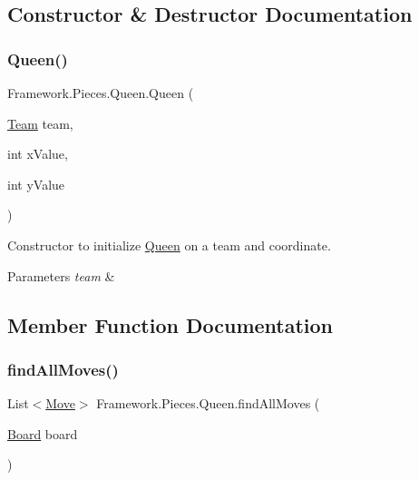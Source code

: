 \subsection{Constructor \& Destructor Documentation}
\hypertarget{class_framework_1_1_pieces_1_1_queen_a017f9ef7c69a9e0b7aadbd301889e465}{}\label{class_framework_1_1_pieces_1_1_queen_a017f9ef7c69a9e0b7aadbd301889e465} 
\subsubsection{\texorpdfstring{Queen()}{Queen()}}
{\footnotesize\ttfamily Framework.\+Pieces.\+Queen.\+Queen (\begin{DoxyParamCaption}\item[{\hyperlink{class_framework_1_1_team}{Team}}]{team,  }\item[{int}]{x\+Value,  }\item[{int}]{y\+Value }\end{DoxyParamCaption})}

Constructor to initialize \hyperlink{class_framework_1_1_pieces_1_1_queen}{Queen} on a team and coordinate. 
\begin{DoxyParams}{Parameters}
{\em team} & \\
\hline
\end{DoxyParams}


\subsection{Member Function Documentation}
\hypertarget{class_framework_1_1_pieces_1_1_queen_a44f0f2dcf3894f0538131e8a7645ab35}{}\label{class_framework_1_1_pieces_1_1_queen_a44f0f2dcf3894f0538131e8a7645ab35} 
\subsubsection{\texorpdfstring{find\+All\+Moves()}{findAllMoves()}}
{\footnotesize\ttfamily List$<$\hyperlink{class_framework_1_1_move}{Move}$>$ Framework.\+Pieces.\+Queen.\+find\+All\+Moves (\begin{DoxyParamCaption}\item[{\hyperlink{class_framework_1_1_board}{Board}}]{board }\end{DoxyParamCaption})}

